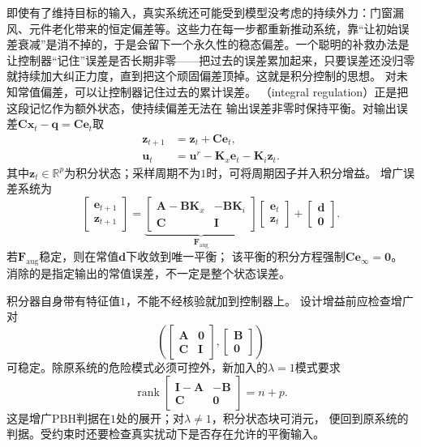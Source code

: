 即使有了维持目标的输入，真实系统还可能受到模型没考虑的持续外力：门窗漏风、元件老化带来的恒定偏差等。这些力在每一步都重新推动系统，靠“让初始误差衰减”是消不掉的，于是会留下一个永久性的稳态偏差。一个聪明的补救办法是让控制器“记住”误差是否长期非零——把过去的误差累加起来，只要误差还没归零就持续加大纠正力度，直到把这个顽固偏差顶掉。这就是积分控制的思想。
对未知常值偏差，可以让控制器记住过去的累计误差。
（integral regulation）正是把这段记忆作为额外状态，使持续偏差无法在
输出误差非零时保持平衡。对输出误差$\bm C\bm x_t-\bm q=\bm C\bm e_t$取
\begin{equation}
  \begin{aligned}
    \bm z_{t+1}&=\bm z_t+\bm C\bm e_t,\\
    \bm u_t&=\bm u^r-\bm K_x\bm e_t-\bm K_i\bm z_t.
  \end{aligned}
  \label{eq:control-integral-regulation}
\end{equation}
其中$\bm z_t\in\mathbb R^p$为积分状态；采样周期不为$1$时，可将周期因子并入积分增益。
增广误差系统为
\[
  \begin{bmatrix}\bm e_{t+1}\\\bm z_{t+1}\end{bmatrix}
  =
  \underbrace{\begin{bmatrix}
    \bm A-\bm B\bm K_x&-\bm B\bm K_i\\
    \bm C&\bm I
  \end{bmatrix}}_{\bm F_{\mathrm{aug}}}
  \begin{bmatrix}\bm e_t\\\bm z_t\end{bmatrix}
  +\begin{bmatrix}\bm d\\\bm0\end{bmatrix}.
\]
若$\bm F_{\mathrm{aug}}$稳定，则在常值$\bm d$下收敛到唯一平衡；
该平衡的积分方程强制$\bm C\bm e_\infty=\bm0$。
消除的是指定输出的常值误差，不一定是整个状态误差。

积分器自身带有特征值$1$，不能不经核验就加到控制器上。
设计增益前应检查增广对
\[
  \left(
   \begin{bmatrix}\bm A&\bm0\\\bm C&\bm I\end{bmatrix},
   \begin{bmatrix}\bm B\\\bm0\end{bmatrix}\right)
\]
可稳定。除原系统的危险模式必须可控外，新加入的$\lambda=1$模式要求
\[
  \operatorname{rank}
  \begin{bmatrix}\bm I-\bm A&-\bm B\\\bm C&\bm0\end{bmatrix}=n+p.
\]
这是增广PBH判据在$1$处的展开；对$\lambda\neq1$，积分状态块可消元，
便回到原系统的判据。受约束时还要检查真实扰动下是否存在允许的平衡输入。

